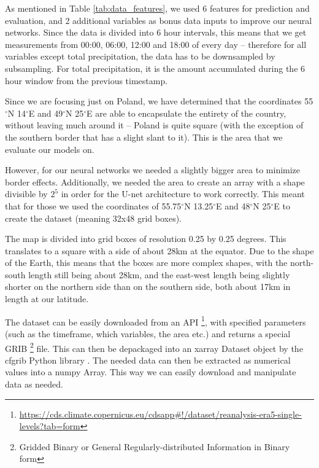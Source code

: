 As mentioned in Table \ref{tab:data_features}, we used 6 features for prediction and evaluation, and 2 additional variables as bonus data inputs to improve our neural networks. Since the data is divided into 6 hour intervals, this means that we get measurements from 00:00, 06:00, 12:00 and 18:00 of every day -- therefore for all variables except total precipitation, the data has to be downsampled by subsampling. For total precipitation, it is the amount accumulated during the 6 hour window from the previous timestamp.

Since we are focusing just on Poland, we have determined that the coordinates 55$^{\circ}$N 14$^{\circ}$E and 49$^{\circ}$N 25$^{\circ}$E are able to encapsulate the entirety of the country, without leaving much around it -- Poland is quite square (with the exception of the southern border that has a slight slant to it). This is the area that we evaluate our models on.

However, for our neural networks we needed a slightly bigger area to minimize border effects. Additionally, we needed the area to create an array with a shape divisible by $2^5$ in order for the U-net architecture to work correctly. This meant that for those we used the coordinates of 55.75$^{\circ}$N 13.25$^{\circ}$E and 48$^{\circ}$N 25$^{\circ}$E to create the dataset (meaning 32x48 grid boxes).

The map is divided into grid boxes of resolution 0.25 by 0.25 degrees. This translates to a square with a side of about 28km at the equator. Due to the shape of the Earth, this means that the boxes are more complex shapes, with the north-south length still being about 28km, and the east-west length being slightly shorter on the northern side than on the southern side, both about 17km in length at our latitude.

The dataset can be easily downloaded from an API \footnote{\url{https://cds.climate.copernicus.eu/cdsapp\#!/dataset/reanalysis-era5-single-levels?tab=form}}, with specified parameters (such as the timeframe, which variables, the area etc.) and returns a special GRIB \footnote{Gridded Binary or General Regularly-distributed Information in Binary form} file. This can then be depackaged into an xarray \cite{hoyer2017xarray} Dataset object by the cfgrib Python library \cite{80908cfgrib}. The needed data can then be extracted as numerical values into a numpy \cite{harris2020array} Array. This way we can easily download and manipulate data as needed.


